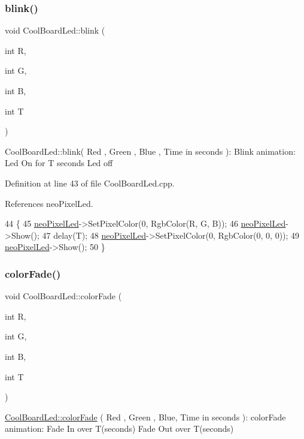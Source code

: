 \subsubsection{\texorpdfstring{blink()}{blink()}}
{\footnotesize\ttfamily void Cool\+Board\+Led\+::blink (\begin{DoxyParamCaption}\item[{int}]{R,  }\item[{int}]{G,  }\item[{int}]{B,  }\item[{int}]{T }\end{DoxyParamCaption})}

Cool\+Board\+Led\+::blink( Red , Green , Blue , Time in seconds )\+: Blink animation\+: Led On for T seconds Led off 

Definition at line 43 of file Cool\+Board\+Led.\+cpp.



References neo\+Pixel\+Led.


\begin{DoxyCode}
44 \{
45     \hyperlink{classCoolBoardLed_ac2c13fa462a010cd9242bf297c013923}{neoPixelLed}->SetPixelColor(0, RgbColor(R, G, B));
46     \hyperlink{classCoolBoardLed_ac2c13fa462a010cd9242bf297c013923}{neoPixelLed}->Show();
47     delay(T);
48     \hyperlink{classCoolBoardLed_ac2c13fa462a010cd9242bf297c013923}{neoPixelLed}->SetPixelColor(0, RgbColor(0, 0, 0));
49     \hyperlink{classCoolBoardLed_ac2c13fa462a010cd9242bf297c013923}{neoPixelLed}->Show();
50 \}
\end{DoxyCode}
\mbox{\label{classCoolBoardLed_a6dbfe23988f43e1242cd05e69b13ff30}} 
\subsubsection{\texorpdfstring{color\+Fade()}{colorFade()}}
{\footnotesize\ttfamily void Cool\+Board\+Led\+::color\+Fade (\begin{DoxyParamCaption}\item[{int}]{R,  }\item[{int}]{G,  }\item[{int}]{B,  }\item[{int}]{T }\end{DoxyParamCaption})}

\hyperlink{classCoolBoardLed_a6dbfe23988f43e1242cd05e69b13ff30}{Cool\+Board\+Led\+::color\+Fade} ( Red , Green , Blue, Time in seconds )\+: color\+Fade animation\+: Fade In over T(seconds) Fade Out over T(seconds) 

